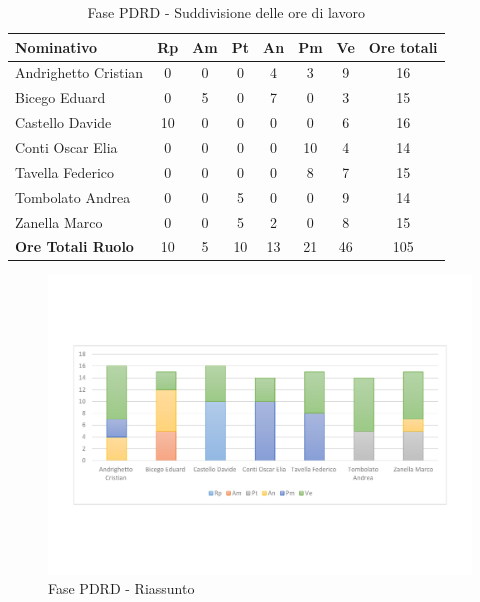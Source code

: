 \documentclass[../PianoProgetto.tex]{subfiles}
\begin{document}
	\begin{table}[h]
	
		\begin{tabularx}{\textwidth}{l  * {6}{C}  c}
			\toprule
			\textbf{Nominativo} & \textbf{Rp} & \textbf{Am} & \textbf{Pt} 
						& \textbf{An} & \textbf{Pm} & \textbf{Ve} & \textbf{Ore totali} \\
			\midrule
			Andrighetto Cristian & 0 & 0 & 0 & 4 & 3 & 9 & 16 \\
			Bicego Eduard & 0 & 5 &	0 &	7 &	0 &	3 &	15 \\
			Castello Davide & 10 & 0 & 0 & 0 & 0 & 6 & 16 \\
			Conti Oscar Elia & 0 & 0 & 0 & 0 & 10 &	4 &	14 \\
			Tavella Federico &	0 & 0 &	0 &	0 &	8 &	7 &	15 \\
			Tombolato Andrea & 0 & 0 & 5 & 0 & 0 & 9 & 14 \\
			Zanella Marco & 0 & 0 & 5 &	2 &	0 &	8 &	15 \\
			\midrule			
			\textbf{Ore Totali Ruolo} & 10 & 5 & 10 & 13 &	21 & 46 & 105 \\
			\bottomrule
		\end{tabularx}
		\caption{Fase PDRD - Suddivisione delle ore di lavoro}
		\label{tab:fasePDRD_ore}
	\end{table}
\vfill	
		
	\begin{figure}[!h]
		\centering
		\includegraphics[width=\textwidth , trim=2cm 5cm 2cm 5cm]{grafici/PDRD/PDRD-ore-persona}
			\caption{Fase PDRD - Riassunto}
		\label{fig:BarChart-fasePDRD_ore}
	\end{figure}
\vfill	
\newpage	
	
\end{document}
